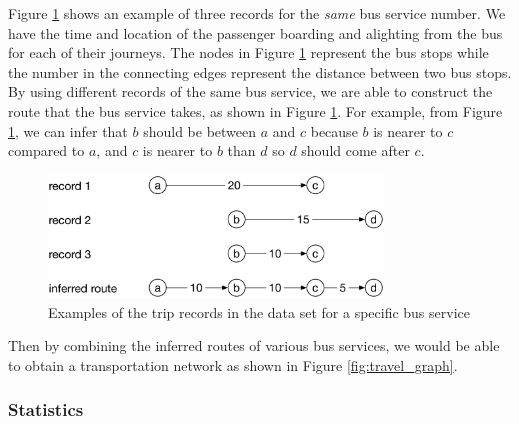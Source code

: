 \documentclass[conference]{IEEEtran.1.8}
\begin{document}
Figure \ref{fig:trip_example} shows an example of three records for the \emph{same} bus service number. We have the time and location of the passenger boarding and alighting from the bus for each of their journeys. The nodes in Figure \ref{fig:trip_example} represent the bus stops while the number in the connecting edges represent the distance between two bus stops. By using different records of the same bus service, we are able to construct the route that the bus service takes, as shown in Figure \ref{fig:trip_example}. For example, from Figure \ref{fig:trip_example}, we can infer that $b$ should be between $a$ and $c$ because $b$ is nearer to $c$ compared to $a$, and $c$ is nearer to $b$ than $d$ so $d$ should come after $c$.
\begin{figure}[htb]
	\centering
	\includegraphics[width=3.5in]{trip_example}
	\caption{Examples of the trip records in the data set for a specific bus service}
	\label{fig:trip_example}
\end{figure}
Then by combining the inferred routes of various bus services, we would be able to obtain a transportation network as shown in Figure \ref{fig:travel_graph}.


\subsubsection{Statistics}
\end{document}
